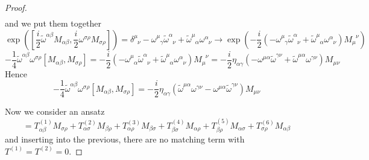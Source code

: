 \begin{proof}
\begin{equation*}
\begin{aligned}
        \end{aligned}
        \end{equation*}
        and we put them together
        \begin{equation*}
            \exp([\frac{i}{2} \tilde \omega^{\alpha \beta} M_{\alpha \beta}, \frac{i}{2} \omega^{\sigma \rho} M_{\sigma \rho}]) = \delta^{\mu}_{\phantom \mu \nu} - \omega^{\mu}_{\phantom \mu \gamma} \tilde \omega^{\alpha}_{\phantom \alpha \nu} + \tilde \omega^{\mu}_{\phantom \mu \alpha} \omega^{\alpha}_{\phantom \alpha \nu} \rightarrow \exp(-\frac{i}{2} (-\omega^{\mu}_{\phantom \mu \gamma} \tilde \omega^{\alpha}_{\phantom \alpha \nu} + \tilde \omega^{\mu}_{\phantom \mu \alpha} \omega^{\alpha}_{\phantom \alpha \nu}) M_\mu^{\phantom \mu\nu})
        \end{equation*}
        \begin{equation*}
            - \frac{1}{4} \tilde \omega^{\alpha \beta} \omega^{\sigma \rho}[M_{\alpha \beta}, M_{\sigma \rho}] = -\frac{i}{2} (-\omega^{\mu}_{\phantom \mu \alpha} \tilde \omega^{\alpha}_{\phantom \alpha \nu} + \tilde \omega^{\mu}_{\phantom \mu \alpha} \omega^{\alpha}_{\phantom \alpha \nu}) M_\mu^{\phantom \mu\nu} = - \frac{i}{2} \eta_{\alpha \gamma} (-\omega^{\mu\alpha} \tilde \omega^{\gamma\nu} + \tilde \omega^{\mu\alpha} \omega^{\gamma \nu}) M_{\mu\nu}
        \end{equation*}
        Hence 
        \begin{equation}\label{pr1}
            - \frac{1}{4} \tilde \omega^{\alpha \beta} \omega^{\sigma \rho}[M_{\alpha \beta}, M_{\sigma \rho}] = - \frac{i}{2} \eta_{\alpha \gamma} (\tilde \omega^{\mu\alpha} \omega^{\gamma \nu} -\omega^{\mu\alpha} \tilde \omega^{\gamma\nu}) M_{\mu\nu}
        \end{equation}
    
        Now we consider an ansatz 
        \begin{equation*}
            [M_{\alpha\beta}, M_{\sigma\rho}] = T^{(1)}_{\alpha\beta} M_{\sigma\rho} + T^{(2)}_{\alpha\sigma} M_{\beta\rho} + T^{(3)}_{\alpha\rho} M_{\beta\sigma} + T^{(4)}_{\beta\sigma} M_{\alpha\rho} + T^{(5)}_{\beta\rho} M_{\alpha\sigma } + T^{(6)}_{\sigma\rho} M_{\alpha\beta}
        \end{equation*}
        and inserting into the previous, there are no matching term with $T^{(1)} = T^{(2)} = 0$. 
    

\end{proof}
